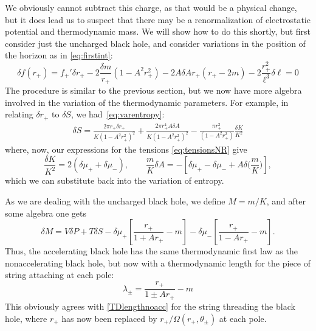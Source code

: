 \documentclass[
twoside,
openright,
frontopenright,
]{dmathesis}
\begin{document}
We obviously cannot
subtract this charge, as that would be a physical change, but it does lead us to
suspect that there may be a renormalization of electrostatic potential and
thermodynamic mass. We will show how to do this shortly, but first consider just
the uncharged black hole, and consider variations in the position of the horizon
as in \cref{eq:firstint}:
\begin{equation}
\delta f(r_+) = f_+' \delta r_+  - 2 \frac{\delta m}{r_+} (1-A^2r_+^2)
- 2 A \delta A r_+ (r_+ - 2m) - 2 \frac{r_+^2}{\ell^3} \delta \ell = 0
\end{equation}
The procedure is similar to the previous section, but we now have
more algebra involved in the variation of the thermodynamic parameters.
For example, in relating $\delta r_+$ to $\delta S$, we had~\eqref{eq:varentropy}:
\begin{align}
\delta S = \frac{2\pi r_+ \delta r_+}{K(1-A^2 r_+^2)^2} + 
\frac{2 \pi r_+^4 A\delta A}{K (1-A^2 r_+^2)^2} - 
\frac{\pi r_+^2}{(1-A^2 r_+^2)} \frac{\delta K}{K^2}
\end{align}
where, now, our expressions for the tensions \cref{eq:tensionsNR} give
\begin{equation}
\label{eq:deltaAKuncharged}
\frac{\delta K}{K^2} = 2 \left ( \delta \mu_+ + \delta \mu_- \right ), \qquad \frac{m}{K} \delta A = - \left [
\delta \mu_+ - \delta \mu_- + A \delta \Big(\frac{m}{K}\Big) \right],
\end{equation}
which we can substitute back into the variation of entropy.

As we are dealing with the uncharged black hole, we define $M=m/K$, and after some
algebra one gets
\begin{equation}
\delta M = V\delta P + T \delta S -
\delta \mu_+ \left [ \frac{r_+}{1+Ar_+} - m \right ] -
\delta \mu_- \left [ \frac{r_+}{1-Ar_+} - m \right ] .
\label{firstaccm}
\end{equation}
Thus, the accelerating black hole has the same thermodynamic first law
as the nonaccelerating black hole, but now with a thermodynamic length
for the piece of string attaching at each pole:
\begin{equation}
\lambda_\pm = \frac{r_+}{1 \pm Ar_+} - m
\end{equation}
This obviously agrees with \cref{TDlengthnoacc} for the string
threading the black hole, where $r_+$ has now been replaced by
$r_+/\Omega(r_+,\theta_\pm)$ at each pole.
\end{document}
